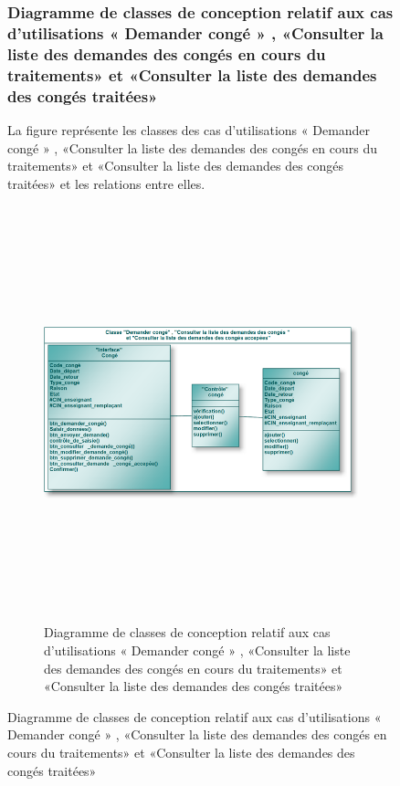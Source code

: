 \documentclass[12 pt]{report}
\begin{document}
\begin{figure}[h]
\begin{center}
\begin{figure}[h]
\begin{center}
\end{center}
\end{figure}
\newpage
\subsubsection{Diagramme de classes de conception relatif aux cas d'utilisations « Demander congé » , «Consulter la liste des demandes des congés en cours du traitements» et «Consulter la liste des demandes des congés traitées» }
La figure  représente les classes des cas d’utilisations « Demander congé » , «Consulter la liste des demandes des congés en cours du traitements» et «Consulter la liste des demandes des congés traitées» et les relations entre elles.
\begin{figure}[h]
 \begin{center}
\includegraphics[width= 16 cm ,height=  12cm]{cl_dc.PNG}
\caption{Diagramme de classes de conception relatif aux cas d'utilisations « Demander congé » , «Consulter la liste des demandes des congés en cours du traitements» et «Consulter la liste des demandes des congés traitées» }

\end{center}
\end{figure}
\newpage

\end{center}
\end{figure}
\end{document}
